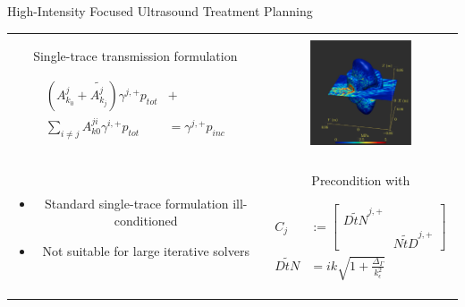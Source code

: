 \documentclass[dvipsnames,10pt]{beamer}
\begin{document}
\begin{frame}{High-Intensity Focused Ultrasound Treatment Planning}
	
	\begin{center}
		\begin{tabular}{cc}
			\begin{minipage}{5cm}
				\vspace{-1cm}
				\begin{small}
						Single-trace transmission formulation
						\begin{tcolorbox}
						$$
						\begin{aligned}
							\left(A_{k_0}^{j} + \widetilde{A_{k_j}^{j}}\right)\gamma^{j,+}p_{tot} &+\\ \sum_{i\neq j}A_{k0}^{ji}\gamma^{i,+}p_{tot} &=\gamma^{j,+}p_{inc}
							\end{aligned}
						$$
						\end{tcolorbox}
				\end{small}
			\end{minipage} &
		\vspace{1cm}
		\includegraphics[width=3cm]{../figs/kidney}\\
		\begin{minipage}{5cm}
			\vspace{-1cm}
			\begin{itemize}
				\item Standard single-trace formulation ill-conditioned
				\item Not suitable for large iterative solvers
			\end{itemize}
		\end{minipage} &
		\begin{minipage}{5cm}
			\vspace{-2cm}
			\begin{small}
			Precondition with
			\begin{tcolorbox}
			$$
			\begin{aligned}
			C_j &:=\begin{bmatrix}\widetilde{DtN}^{j, +} & \\
				                                    & \widetilde{NtD}^{j, +}
				   \end{bmatrix}\\
			 \widetilde{DtN} &= ik\sqrt{1 + \frac{\Delta_{\Gamma}}{k_{\epsilon}^2}}
		\end{aligned}
	$$
	\end{tcolorbox}
			

\end{small}
\end{minipage}
\end{tabular}
\end{center}
\end{frame}
\end{document}
